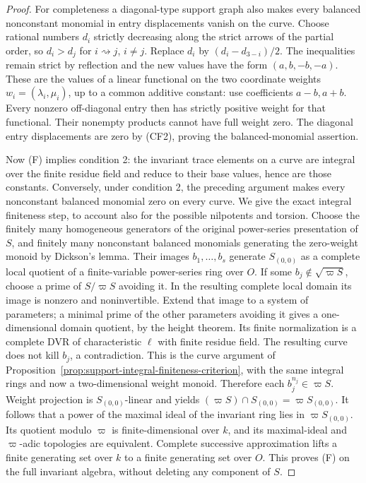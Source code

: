 \begin{proof}
For completeness a diagonal-type support graph
also makes every balanced nonconstant monomial
in entry displacements vanish on the curve.
Choose rational numbers \(d_i\) strictly decreasing
along the strict arrows of the partial order, so
\(d_i>d_j\) for \(i\rightsquigarrow j\), \(i\ne j\).
Replace \(d_i\) by
\((d_i-d_{3-i})/2\). The inequalities remain strict
by reflection and the new values have the form
\((a,b,-b,-a)\). These are the values of a linear
functional on the two coordinate weights
\(w_i=(\lambda_i,\mu_i)\), up to a common additive
constant: use coefficients \(a-b,a+b\).
Every nonzero off-diagonal entry then has strictly
positive weight for that functional. Their nonempty
products cannot have full weight zero.
The diagonal entry displacements are zero by
(CF2), proving the balanced-monomial assertion.

Now (F) implies condition 2: the invariant trace
elements on a curve are integral over the finite
residue field and reduce to their base values, hence
are those constants. Conversely, under condition 2,
the preceding argument makes every nonconstant
balanced monomial zero on every curve.
We give the exact integral finiteness step, to
account also for the possible nilpotents and torsion.
Choose the finitely many homogeneous generators
of the original power-series presentation of \(S\),
and finitely many nonconstant balanced monomials
generating the zero-weight monoid by Dickson's lemma.
Their images \(b_1,\ldots,b_s\) generate
\(S_{(0,0)}\) as a complete local quotient of a
finite-variable power-series ring over \(O\).
If some \(b_j\notin\sqrt{\varpi S}\), choose a prime
of \(S/\varpi S\) avoiding it. In the resulting
complete local domain its image is nonzero and
noninvertible. Extend that image to a system of
parameters; a minimal prime of the other parameters
avoiding it gives a one-dimensional domain quotient,
by the height theorem. Its finite normalization is
a complete DVR of characteristic \(\ell\) with
finite residue field. The resulting curve does not
kill \(b_j\), a contradiction.
This is the curve argument of
Proposition~\ref{prop:support-integral-finiteness-criterion},
with the same integral rings and now a two-dimensional
weight monoid. Therefore each \(b_j^{n_j}\in\varpi S\).
Weight projection is \(S_{(0,0)}\)-linear and yields
\((\varpi S)\cap S_{(0,0)}=\varpi S_{(0,0)}\).
It follows that a power of the maximal ideal
of the invariant ring lies in \(\varpi S_{(0,0)}\).
Its quotient modulo \(\varpi\) is finite-dimensional
over \(k\), and its maximal-ideal and \(\varpi\)-adic
topologies are equivalent. Complete successive
approximation lifts a finite generating set over
\(k\) to a finite generating set over \(O\).
This proves (F) on the full invariant algebra,
without deleting any component of \(S\).


\end{proof}
